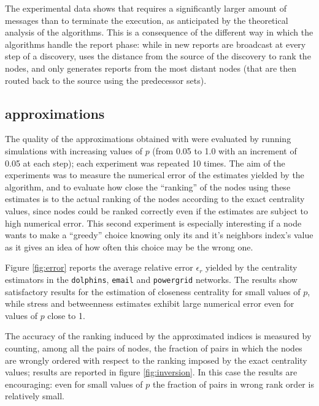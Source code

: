 The experimental data shows that \deccen{} requires a significantly larger amount of messages than \multibfs{} to terminate the execution, as anticipated by the theoretical analysis of the algorithms. This is a consequence of the different way in which the algorithms handle the report phase: while in \deccen{} new reports are broadcast at every step of a discovery, \multibfs{} uses the distance from the source of the discovery to rank the nodes, and only generates reports from the most distant nodes (that are then routed back to the source using the predecessor sets).

\subsection{\multibfs{} approximations}

The quality of the approximations obtained with \multibfs{} were evaluated by running simulations with increasing values of $p$ (from 0.05 to 1.0 with an increment of 0.05 at each step); each experiment was repeated 10 times. The aim of the experiments was to measure the numerical error of the estimates yielded by the algorithm, and to evaluate how close the ``ranking'' of the nodes using these estimates is to the actual ranking of the nodes according to the exact centrality values, since nodes could be ranked correctly even if the estimates are subject to high numerical error. This second experiment is especially interesting if a node wants to make a ``greedy'' choice knowing only its and it's neighbors index's value as it gives an idea of how often this choice may be the wrong one.

Figure \ref{fig:error} reports the average relative error $\epsilon_r$ yielded by the centrality estimators in the \texttt{dolphins}, \texttt{email} and \texttt{powergrid} networks. The results show satisfactory results for the estimation of closeness centrality for small values of $p$, while stress and betweenness estimates exhibit large numerical error even for values of $p$ close to 1.



The accuracy of the ranking induced by the approximated indices is measured by counting, among all the pairs of nodes, the fraction of pairs in which the nodes are wrongly ordered with respect to the ranking imposed by the exact centrality values; results are reported in figure \ref{fig:inversion}. In this case the results are encouraging: even for small values of $p$ the fraction of pairs in wrong rank order is relatively small.


